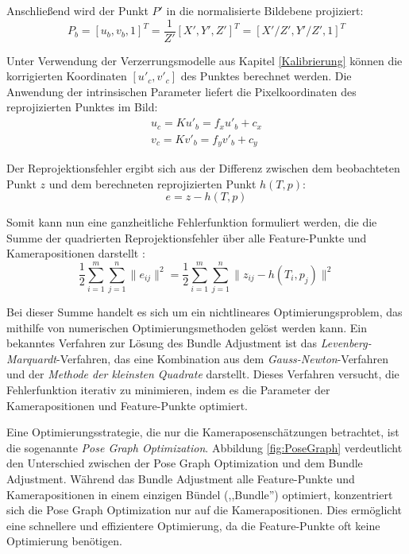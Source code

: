 Anschließend wird der Punkt \( P' \) in die normalisierte Bildebene projiziert:
\begin{equation}
    P_b = [u_b, v_b, 1]^T = \frac{1}{Z'}[X', Y', Z']^T = [X'/Z', Y'/Z', 1]^T
\end{equation}

Unter Verwendung der Verzerrungsmodelle aus Kapitel \ref{Kalibrierung} können die korrigierten Koordinaten \( [u'_c, v'_c] \) des Punktes berechnet werden. Die Anwendung der intrinsischen Parameter liefert die Pixelkoordinaten des reprojizierten Punktes im Bild:
\begin{equation}
    \begin{aligned}
        u_c = Ku'_b = f_xu'_b + c_x \\
        v_c = Kv'_b = f_yv'_b + c_y
    \end{aligned}
\end{equation}

Der Reprojektionsfehler ergibt sich aus der Differenz zwischen dem beobachteten Punkt \( z \) und dem berechneten reprojizierten Punkt \( h(T,p) \):
\begin{equation}
    e = z - h(T,p)
\end{equation}

Somit kann nun eine ganzheitliche Fehlerfunktion formuliert werden, die die Summe der quadrierten Reprojektionsfehler über alle Feature-Punkte und Kamerapositionen darstellt \cite{gao2021vSLAM}:
\begin{equation}
    \frac{1}{2} \sum_{i=1}^{m} \sum_{j=1}^{n} \| e_{ij} \|^2 = \frac{1}{2} \sum_{i=1}^{m} \sum_{j=1}^{n} \| z_{ij} - h(T_i, p_j) \|^2
\end{equation}

Bei dieser Summe handelt es sich um ein nichtlineares Optimierungsproblem, das mithilfe von numerischen Optimierungsmethoden gelöst werden kann. Ein bekanntes Verfahren zur Lösung des Bundle Adjustment ist das \emph{Levenberg-Marquardt}-Verfahren, das eine Kombination aus dem \emph{Gauss-Newton}-Verfahren und der \emph{Methode der kleinsten Quadrate} darstellt. Dieses Verfahren versucht, die Fehlerfunktion iterativ zu minimieren, indem es die Parameter der Kamerapositionen und Feature-Punkte optimiert. \cite{gao2021vSLAM, levenberg2024minimization}

Eine Optimierungsstrategie, die nur die Kameraposenschätzungen betrachtet, ist die sogenannte \emph{Pose Graph Optimization}. Abbildung \ref{fig:PoseGraph} verdeutlicht den Unterschied zwischen der Pose Graph Optimization und dem Bundle Adjustment. Während das Bundle Adjustment alle Feature-Punkte und Kamerapositionen in einem einzigen Bündel (,,Bundle'') optimiert, konzentriert sich die Pose Graph Optimization nur auf die Kamerapositionen. Dies ermöglicht eine schnellere und effizientere Optimierung, da die Feature-Punkte oft keine Optimierung benötigen. \cite{gao2021vSLAM}

